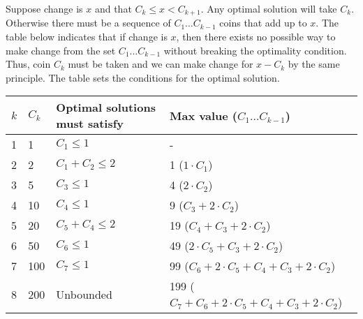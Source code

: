 \documentclass[11pt]{article}
\begin{document}
\begin{flushleft}
	Suppose change is $x$ and that $C_{k} \leq x < C_{k + 1}$. Any optimal solution will take $C_k$. Otherwise there must be a sequence of $C_1 \dots C_{k -1}$ coins that add up to $x$. The table below indicates that if change is $x$, then there exists no possible way to make change from the set $C_1 \dots C_{k - 1}$ without breaking the optimality condition. Thus, coin $C_k$ must be taken and we can make change for $x - C_k$ by the same principle. The table sets the conditions for the optimal solution. 
	
	\begin{center}
		\begin{tabular}{ | l | l | p{8cm} | p{6cm} |}
			\hline
			$k$ & $C_k$ & Optimal solutions must satisfy & Max value ($C_1 \dots C_{k - 1}$) \\ \hline
			1 & 1 & $C_1 \leq 1$ & - \\
			
			\hline
			2 & 2 & $C_1 + C_2 \leq 2$ & 1 ($1 \cdot C_1$) \\
			
			\hline
			3 & 5 & $C_3 \leq 1$ & 4 ($2\cdot C_2$) \\
			
			\hline
			4 & 10 & $C_4 \leq 1$ & 9 ($C_3 + 2\cdot C_2$) \\
			
			\hline
			5 & 20 & $C_5 + C_4 \leq 2$ & 19 ($C_4 + C_3 + 2\cdot C_2$) \\
			
			\hline
			6  & 50 & $C_6 \leq1$ & 49 ($2\cdot C_5 + C_3 + 2\cdot C_2$) \\
			
			\hline
			7 & 100 & $C_7 \leq 1$ & 99 ($C_6 + 2\cdot C_5 + C_4 + C_3 + 2 \cdot C_2$) \\
			
			\hline 
			8 & 200 & Unbounded & 199 ($C_7 + C_6 + 2\cdot C_5 + C_4 + C_3 + 2 \cdot C_2$)\\
			
			\hline
		\end{tabular}
	\end{center}
	

\end{flushleft}
\end{document}
